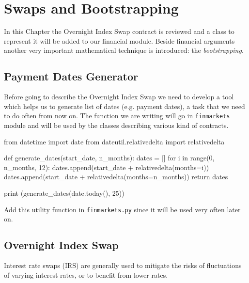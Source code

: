 \chapter{Swaps and Bootstrapping}\label{sec:swaps-and-bootstrapping}

In this Chapter the Overnight Index Swap contract is reviewed and a class to represent it will be added to our financial module. Beside financial arguments another very important mathematical technique is introduced: the \emph{bootstrapping}.

\section{Payment Dates Generator}
Before going to describe the Overnight Index Swap we need to develop a tool which helps us to generate list of dates (e.g. payment dates), a task that we need to do often from now on. 
The function we are writing will go in \texttt{finmarkets} module and will be used by the classes describing various kind of contracts.

\begin{ipython}
from datetime import date
from dateutil.relativedelta import relativedelta

def generate_dates(start_date, n_months):
    dates = []
    for i in range(0, n_months, 12):
        dates.append(start_date + relativedelta(months=i))
    dates.append(start_date + relativedelta(months=n_months))
    return dates

print (generate_dates(date.today(), 25))
\end{ipython}
\begin{ioutput}
\end{ioutput}

\begin{finmarkets}
Add this utility function in \texttt{finmarkets.py} since it will be used very often later on.
\end{finmarkets}

\section{Overnight Index Swap}\label{overnight-index-swap}

Interest rate swaps (IRS) are generally used to mitigate the risks of
fluctuations of varying interest rates, or to benefit from lower rates.


